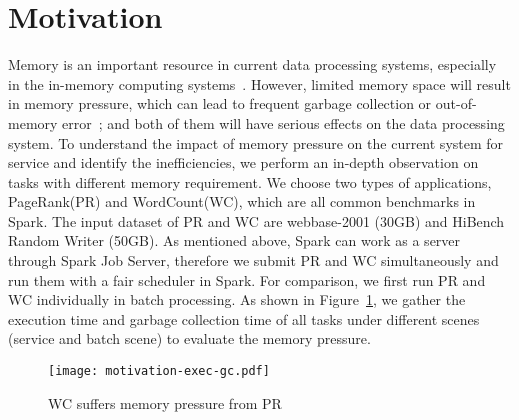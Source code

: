\section{Motivation}
\label{sec:motivation}

Memory is an important resource in current data processing systems, especially in the in-memory computing systems~\cite{shi:mammoth}. However, limited memory space will result in memory pressure, which can lead to frequent garbage collection or out-of-memory error~\cite{fang2015interruptible}; and both of them will have serious effects on the data processing system. To understand the impact of memory pressure on the current system for service and identify the inefficiencies, we perform an in-depth observation on tasks with different memory requirement. We choose two types of applications, PageRank(PR) and WordCount(WC), which are all common benchmarks in Spark. The input dataset of PR and WC are webbase-2001 (30GB) and HiBench Random Writer (50GB).  As mentioned above, Spark can work as a server through Spark Job Server, therefore we submit PR and WC simultaneously and run them with a fair scheduler in Spark. For comparison, we first run PR and WC individually in batch processing. As shown in Figure~\ref{fig:memorypressure}, we gather the execution time and garbage collection time of all tasks under different scenes (service and batch scene) to evaluate the memory pressure. 


\begin{figure}[!t]
\centering
\texttt{[image: motivation-exec-gc.pdf]}
\vspace{-2mm}
\caption{WC suffers memory pressure from PR}
\vspace{-6mm}
\label{fig:memorypressure}
\end{figure}

